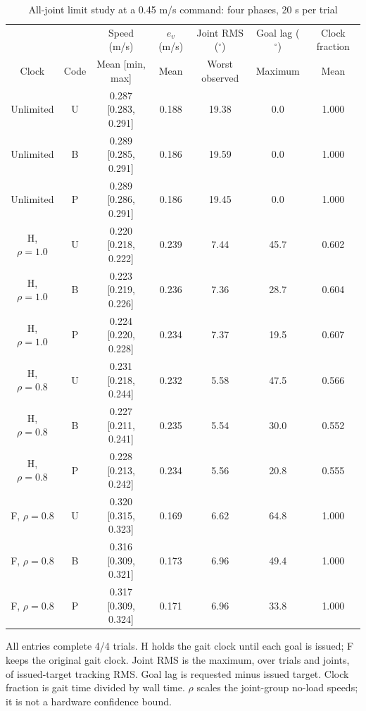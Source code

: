 \begin{table}[t]\centering\small
\caption{All-joint limit study at a 0.45 m/s command: four phases, 20 s per trial}
\label{tab:joint}\begin{tabular}{ccccccc}\toprule
 & & Speed (m/s) & $e_v$ (m/s) & Joint RMS ($^\circ$) & Goal lag ($^\circ$) & Clock fraction\\
Clock & Code & Mean [min, max] & Mean & Worst observed & Maximum & Mean\\\midrule
Unlimited & U & 0.287 [0.283, 0.291] & 0.188 & 19.38 & 0.0 & 1.000\\
Unlimited & B & 0.289 [0.285, 0.291] & 0.186 & 19.59 & 0.0 & 1.000\\
Unlimited & P & 0.289 [0.286, 0.291] & 0.186 & 19.45 & 0.0 & 1.000\\
\midrule
H, $\rho=1.0$ & U & 0.220 [0.218, 0.222] & 0.239 & 7.44 & 45.7 & 0.602\\
H, $\rho=1.0$ & B & 0.223 [0.219, 0.226] & 0.236 & 7.36 & 28.7 & 0.604\\
H, $\rho=1.0$ & P & 0.224 [0.220, 0.228] & 0.234 & 7.37 & 19.5 & 0.607\\
\midrule
H, $\rho=0.8$ & U & 0.231 [0.218, 0.244] & 0.232 & 5.58 & 47.5 & 0.566\\
H, $\rho=0.8$ & B & 0.227 [0.211, 0.241] & 0.235 & 5.54 & 30.0 & 0.552\\
H, $\rho=0.8$ & P & 0.228 [0.213, 0.242] & 0.234 & 5.56 & 20.8 & 0.555\\
\midrule
F, $\rho=0.8$ & U & 0.320 [0.315, 0.323] & 0.169 & 6.62 & 64.8 & 1.000\\
F, $\rho=0.8$ & B & 0.316 [0.309, 0.321] & 0.173 & 6.96 & 49.4 & 1.000\\
F, $\rho=0.8$ & P & 0.317 [0.309, 0.324] & 0.171 & 6.96 & 33.8 & 1.000\\
\bottomrule
\end{tabular}
\par\vspace{5pt}\noindent\parbox{.96\textwidth}{\footnotesize All entries complete 4/4 trials. H holds the gait clock until each goal is issued; F keeps the original gait clock. Joint RMS is the maximum, over trials and joints, of issued-target tracking RMS. Goal lag is requested minus issued target. Clock fraction is gait time divided by wall time. $\rho$ scales the joint-group no-load speeds; it is not a hardware confidence bound.}
\end{table}
